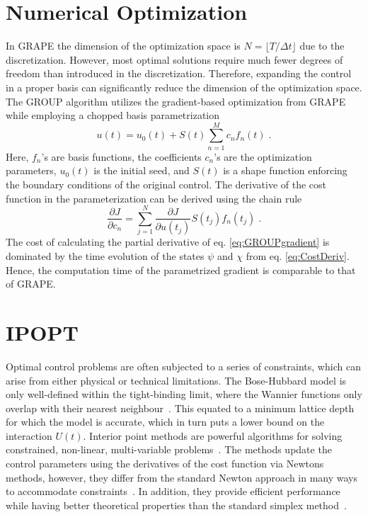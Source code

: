 \section{Numerical Optimization}

In GRAPE the dimension of the optimization space is $N = \lfloor T / \Delta t \rfloor$ due to the discretization. However, most optimal solutions require much fewer degrees of freedom than introduced in the discretization. Therefore, expanding the control in a proper basis can significantly reduce the dimension of the optimization space.
The GROUP algorithm utilizes the gradient-based optimization from GRAPE while employing a chopped basis parametrization 
\begin{equation}
	u(t) = u_0 (t) + S(t) \sum_{n=1}^{M} c_n f_n (t) \; . \label{eq:controlParametrization}
\end{equation}
Here, $f_n$'s are basis functions, the coefficients $c_n$'s are the optimization parameters, $u_0 (t)$ is the initial seed, and $S(t)$ is a shape function enforcing the boundary conditions of the original control. The derivative of the cost function in the parameterization can be derived using the chain rule
\begin{equation}
	\frac{\partial J }{\partial c_n} = \sum_{j = 1}^{N} \frac{\partial J }{\partial u(t_j)} S(t_j) f_n(t_j) \; . \label{eq:GROUPgradient} 
\end{equation}
The cost of calculating the partial derivative of eq. \eqref{eq:GROUPgradient} is dominated by the time evolution of the states $\psi$ and $\chi$ from eq. \eqref{eq:CostDeriv}. Hence, the computation time of the parametrized gradient is comparable to that of GRAPE.


\section{IPOPT}

Optimal control problems are often subjected to a series of constraints, which can arise from either physical or technical limitations. The Bose-Hubbard model is only well-defined within the tight-binding limit, where the Wannier functions only overlap with their nearest neighbour~\cite{bloch2008many}. This equated to a minimum lattice depth for which the model is accurate, which in turn puts a lower bound on the interaction $U(t)$.
Interior point methods are powerful algorithms for solving constrained, non-linear, multi-variable problems~\cite{NocedalWright2006}. The methods update the control parameters using the derivatives of the cost function via Newtons methods, however, they differ from the standard Newton approach in many ways to accommodate constraints~\cite{Karmarkar1984,Wachter2006}. In addition, they provide efficient performance while having better theoretical properties than the standard simplex method~\cite{NocedalWright2006}.\\ 

